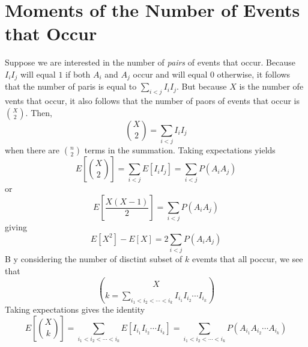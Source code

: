 \section{Moments of the Number of Events that Occur}
Suppose we are interested in the number of \textit{pairs} of events that occur. Because $I_iI_j$ will equal $1$ if both $A_i$ and $A_j$ occur and will equal 0 otherwise, it follows that the number of paris is equal to $\sum_{i<j} I_iI_j$. But because $X$ is the number ofe vents that occur, it also follows that the number of paors of events that occur is ${X\choose 2}$.
Then, \[{X\choose 2} = \sum_{i < j} I_iI_j\] when there are $n\choose 2$ terms in the summation. Taking expectations yields \[E\left[{X\choose 2}\right] = \sum_{i < j} E[I_iI_j] = \sum_{i < j} P(A_iA_j)\] or \[E\left[\frac{X(X-1)}{2}\right] = \sum_{i < j} P(A_iA_j)\] giving \[E[X^2] - E[X] = 2\sum_{i < j} P(A_iA_j)\] B y considering the number of disctint subset of $k$ evemts that all poccur, we see that \[X\choose k = \sum_{i_1 < i_2 < \cdots < i_k} I_{i_1}I_{i_2}\cdots I_{i_k}\]
Taking expectations gives the identity\[E\left[{X\choose k}\right] = \sum_{i_1 < i_2 < \cdots < i_k} E[I_{i_1}I_{i_2}\cdots I_{i_k}] = \sum_{i_1 < i_2 < \cdots < i_k} P(A_{i_1}A_{i_2}\cdots A_{i_k})\]
